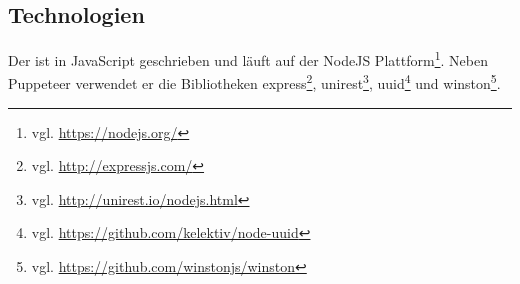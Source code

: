 \subsection{Technologien}
    Der {\classificationService} ist in JavaScript geschrieben und läuft auf der
    NodeJS Plattform\footnote{vgl. \url{https://nodejs.org/}}.
    Neben Puppeteer verwendet er die Bibliotheken
    express\footnote{vgl. \url{http://expressjs.com/}},
    unirest\footnote{vgl. \url{http://unirest.io/nodejs.html}},
    uuid\footnote{vgl. \url{https://github.com/kelektiv/node-uuid}}
    und winston\footnote{vgl. \url{https://github.com/winstonjs/winston}}.